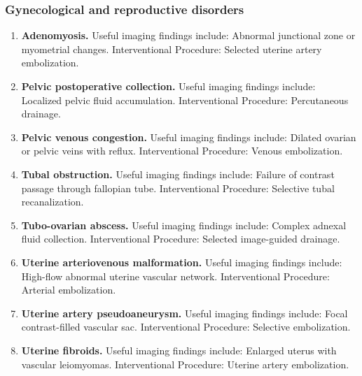 \subsubsection{Gynecological and reproductive disorders}
\begin{enumerate}[leftmargin=*,itemsep=0.45em,topsep=0.4em]
\item \textbf{Adenomyosis.} Useful imaging findings include: Abnormal junctional zone or myometrial changes. Interventional Procedure: Selected uterine artery embolization.
\item \textbf{Pelvic postoperative collection.} Useful imaging findings include: Localized pelvic fluid accumulation. Interventional Procedure: Percutaneous drainage.
\item \textbf{Pelvic venous congestion.} Useful imaging findings include: Dilated ovarian or pelvic veins with reflux. Interventional Procedure: Venous embolization.
\item \textbf{Tubal obstruction.} Useful imaging findings include: Failure of contrast passage through fallopian tube. Interventional Procedure: Selective tubal recanalization.
\item \textbf{Tubo-ovarian abscess.} Useful imaging findings include: Complex adnexal fluid collection. Interventional Procedure: Selected image-guided drainage.
\item \textbf{Uterine arteriovenous malformation.} Useful imaging findings include: High-flow abnormal uterine vascular network. Interventional Procedure: Arterial embolization.
\item \textbf{Uterine artery pseudoaneurysm.} Useful imaging findings include: Focal contrast-filled vascular sac. Interventional Procedure: Selective embolization.
\item \textbf{Uterine fibroids.} Useful imaging findings include: Enlarged uterus with vascular leiomyomas. Interventional Procedure: Uterine artery embolization.
\end{enumerate}

